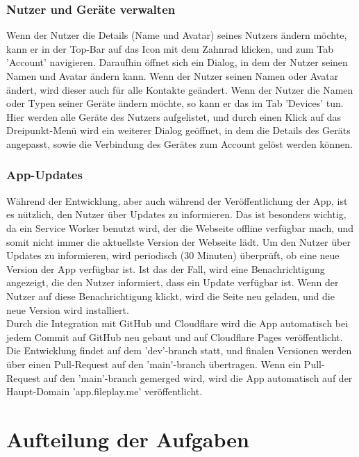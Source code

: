 \documentclass[a4paper]{article}
\begin{document}
\subsubsection{Nutzer und Geräte verwalten}

Wenn der Nutzer die Details (Name und Avatar) seines Nutzers ändern möchte, kann
er in der Top-Bar auf das Icon mit dem Zahnrad klicken, und zum Tab 'Account'
navigieren. Daraufhin öffnet sich ein Dialog, in dem der Nutzer seinen Namen und
Avatar ändern kann. Wenn der Nutzer seinen Namen oder Avatar ändert, wird dieser
auch für alle Kontakte geändert. Wenn der Nutzer die Namen oder Typen seiner
Geräte ändern möchte, so kann er das im Tab 'Devices' tun. Hier werden alle
Geräte des Nutzers aufgelistet, und durch einen Klick auf das Dreipunkt-Menü
wird ein weiterer Dialog geöffnet, in dem die Details des Geräts angepasst,
sowie die Verbindung des Gerätes zum Account gelöst werden können.

\subsubsection{App-Updates}

Während der Entwicklung, aber auch während der Veröffentlichung der App, ist es
nützlich, den Nutzer über Updates zu informieren. Das ist besonders wichtig, da
ein Service Worker benutzt wird, der die Webseite offline verfügbar mach, und
somit nicht immer die aktuellste Version der Webseite lädt. Um den Nutzer über
Updates zu informieren, wird periodisch (30 Minuten) überprüft, ob eine neue
Version der App verfügbar ist. Ist das der Fall, wird eine Benachrichtigung
angezeigt, die den Nutzer informiert, dass ein Update verfügbar ist. Wenn der
Nutzer auf diese Benachrichtigung klickt, wird die Seite neu geladen, und die
neue Version wird installiert.\\
Durch die Integration mit GitHub und Cloudflare wird die App automatisch bei
jedem Commit auf GitHub neu gebaut und auf Cloudflare Pages veröffentlicht. Die
Entwicklung findet auf dem 'dev'-branch statt, und finalen Versionen werden über
einen Pull-Request auf den 'main'-branch übertragen. Wenn ein Pull-Request auf
den 'main'-branch gemerged wird, wird die App automatisch auf der Haupt-Domain
'app.fileplay.me' veröffentlicht.


\section{Aufteilung der Aufgaben}
\end{document}
